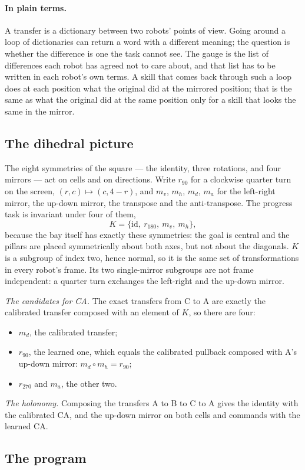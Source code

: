 \documentclass[11pt]{article}
\newcommand{\plain}{\paragraph{In plain terms.}}
\theoremstyle{definition}
\theoremstyle{plain}
\begin{document}
\plain A transfer is a dictionary between two robots' points of view. Going around a loop of
dictionaries can return a word with a different meaning; the question is whether the difference is
one the task cannot see. The gauge is the list of differences each robot has agreed not to care
about, and that list has to be written in each robot's own terms. A skill that comes back through
such a loop does at each position what the original did at the mirrored position; that is the same
as what the original did at the same position only for a skill that looks the same in the mirror.

\subsection{The dihedral picture}

The eight symmetries of the square --- the identity, three rotations, and four mirrors --- act on
cells and on directions. Write $r_{90}$ for a clockwise quarter turn on the screen,
$(r,c)\mapsto(c,4-r)$, and $m_v$, $m_h$, $m_d$, $m_a$ for the left-right mirror, the up-down mirror,
the transpose and the anti-transpose. The progress task is invariant under four of them,
\[
K=\{\mathrm{id},\ r_{180},\ m_v,\ m_h\},
\]
because the bay itself has exactly these symmetries: the goal is central and the pillars are placed
symmetrically about both axes, but not about the diagonals. $K$ is a subgroup of index two, hence
normal, so it is the same set of transformations in every robot's frame. Its two single-mirror
subgroups are not frame independent: a quarter turn exchanges the left-right and the up-down mirror.

\emph{The candidates for CA.} The exact transfers from C to A are exactly the calibrated transfer
composed with an element of $K$, so there are four:
\begin{itemize}
\item $m_d$, the calibrated transfer;
\item $r_{90}$, the learned one, which equals the calibrated pullback composed with A's up-down
mirror: $m_d\circ m_h=r_{90}$;
\item $r_{270}$ and $m_a$, the other two.
\end{itemize}
\emph{The holonomy.} Composing the transfers A to B to C to A gives the identity with the calibrated
CA, and the up-down mirror on both cells and commands with the learned CA.

\subsection{The program}
\end{document}
